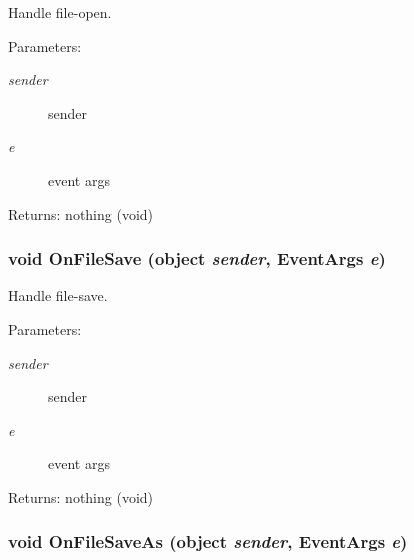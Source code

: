 Handle file-open. 

\begin{Desc}
\item[Parameters:]
\begin{description}
\item[{\em sender}]sender \item[{\em e}]event args \end{description}
\end{Desc}
\begin{Desc}
\item[Returns:]nothing (void) \end{Desc}
\subsubsection{\setlength{\rightskip}{0pt plus 5cm}void On\-File\-Save (object {\em sender}, Event\-Args {\em e})\hspace{0.3cm}{\tt  [private]}}\label{class_c_s_image_viewer_1_1_c_s_image_viewer_3be1eef5825d5fcade13c996cdd18b3c}


Handle file-save. 

\begin{Desc}
\item[Parameters:]
\begin{description}
\item[{\em sender}]sender \item[{\em e}]event args \end{description}
\end{Desc}
\begin{Desc}
\item[Returns:]nothing (void) \end{Desc}
\subsubsection{\setlength{\rightskip}{0pt plus 5cm}void On\-File\-Save\-As (object {\em sender}, Event\-Args {\em e})\hspace{0.3cm}{\tt  [private]}}\label{class_c_s_image_viewer_1_1_c_s_image_viewer_5585cc6a3dcf957fe357138bcb1a3fec}



